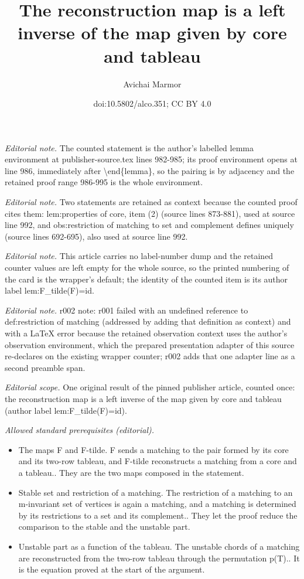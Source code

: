 \documentclass[11pt]{article}
\title{The reconstruction map is a left inverse of the map given by core and tableau}
\author{Avichai Marmor}
\date{doi:10.5802/alco.351; CC BY 4.0}
\theoremstyle{definition}
\numberwithin{equation}{section}
\begin{document}
\maketitle
\noindent\textit{Editorial note.} The counted statement is the author's labelled lemma environment at publisher-source.tex lines 982-985; its proof environment opens at line 986, immediately after \textbackslash{}end\{lemma\}, so the pairing is by adjacency and the retained proof range 986-995 is the whole environment.\par\medskip
\noindent\textit{Editorial note.} Two statements are retained as context because the counted proof cites them: lem:properties of core, item (2) (source lines 873-881), used at source line 992, and obs:restriction of matching to set and complement defines uniquely (source lines 692-695), also used at source line 992.\par\medskip
\noindent\textit{Editorial note.} This article carries no label-number dump and the retained counter values are left empty for the whole source, so the printed numbering of the card is the wrapper's default; the identity of the counted item is its author label lem:F\_tilde(F)=id.\par\medskip
\noindent\textit{Editorial note.} r002 note: r001 failed with an undefined reference to def:restriction of matching (addressed by adding that definition as context) and with a LaTeX error because the retained observation context uses the author's observation environment, which the prepared presentation adapter of this source re-declares on the existing wrapper counter; r002 adds that one adapter line as a second preamble span.\par\medskip
\noindent\textit{Editorial scope.} One original result of the pinned publisher article, counted once: the reconstruction map is a left inverse of the map given by core and tableau (author label lem:F\_tilde(F)=id).\par\medskip
\noindent\textit{Allowed standard prerequisites (editorial).}\begin{itemize}
\item The maps F and F-tilde. F sends a matching to the pair formed by its core and its two-row tableau, and F-tilde reconstructs a matching from a core and a tableau.. They are the two maps composed in the statement.
\item Stable set and restriction of a matching. The restriction of a matching to an m-invariant set of vertices is again a matching, and a matching is determined by its restrictions to a set and its complement.. They let the proof reduce the comparison to the stable and the unstable part.
\item Unstable part as a function of the tableau. The unstable chords of a matching are reconstructed from the two-row tableau through the permutation p(T).. It is the equation proved at the start of the argument.
\end{itemize}\medskip
\end{document}
